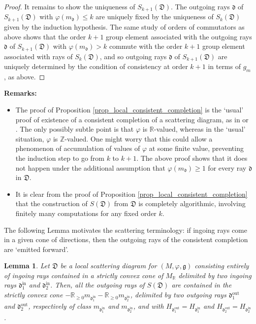 \documentclass[12pt, a4paper]{amsart}
\newtheorem{lem}[defn]{Lemma}
\newcommand\R{\mathbb R}
\newcommand\Z{\mathbb Z}
\newcommand\fd{\mathfrak d}
\newcommand\fD{\mathfrak D}
\newcommand\fg{\mathfrak g}
\newcommand\iin{\mathrm{in}}
\newcommand\oout{\mathrm{out}}
\begin{document}
\begin{proof}
It remains to show the uniqueness of 
$S_{k+1}(\fD)$. The outgoing rays $\fd$ of 
$S_{k+1}(\fD)$ with $\varphi(m_\fd) \leqslant k$ are uniquely fixed by the uniqueness of $S_k(\fD)$ given by the induction hypothesis. The same study of 
orders of commutators as above shows that the order $k+1$ group element  associated with 
the outgoing rays $\fd$ of $S_{k+1}(\fD)$
with $\varphi(m_\fd)>k$ commute with the order $k+1$ group element associated with rays of $S_k(\fD)$, and so outgoing rays $\fd$ of $S_{k+1}(\fD)$ are uniquely determined  by the condition of consistency at order $k+1$ in terms of $g_m$, as above.  
\end{proof}

\textbf{Remarks:} 
\begin{itemize}
\item[(i)] The proof of Proposition \ref{prop_local_consistent_completion} is the 
`usual' proof of existence of a consistent completion of a scattering diagram, as in \cite[Theorem 6]{MR2181810}
or 
\cite[Theorem 1.4]{MR2667135}. 
The only possibly subtle point is that $\varphi$ is 
$\R$-valued, whereas in the `usual' situation, $\varphi$ is $\Z$-valued. One might worry that this could allow a phenomenon of accumulation of values of $\varphi$ at some finite value, preventing the induction step to go from $k$ to $k+1$. 
The above proof shows that it does not happen under the additional assumption that $\varphi(m_\fd) \geqslant 1$ for every ray 
$\fd$ in $\fD$.
\item[(ii)] It is clear from the proof of Proposition
\ref{prop_local_consistent_completion} that the construction of $S(\fD)$ from $\fD$ is completely algorithmic, involving finitely many computations for any fixed order $k$.
\end{itemize}

The following Lemma motivates the scattering terminology: if ingoing rays come in a given cone of directions, then the outgoing rays of the consistent completion are `emitted forward'.

\begin{lem} \label{lem_scattering_forward}
Let $\fD$ be a local scattering diagram for 
$(M,\varphi,\fg)$ consisting entirely of ingoing rays contained in a strictly convex cone of $M_\R$ delimited by two ingoing rays 
$\fd_1^\iin$ and $\fd_2^\iin$. Then, all the outgoing rays of $S(\fD)$ are contained in the strictly convex cone $-\R_{\geqslant 0}m_{\fd_1^\iin}-\R_{\geqslant 0}m_{\fd_2^\iin}$, delimited by two outgoing rays 
$\fd_1^\oout$ and $\fd_2^\oout$, respectively of class 
$m_{\fd_1^\iin}$ and $m_{\fd_2^\iin}$, and with $H_{\fd_1^\oout}=H_{\fd_1^\iin}$
and $H_{\fd_2^\oout}=H_{\fd_2^\iin}$.
\end{lem}
\end{document}
